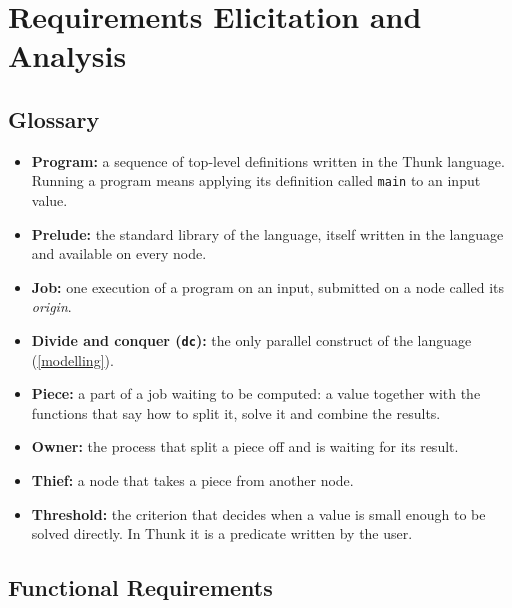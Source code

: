 \documentclass{scrartcl}
\begin{document}
\section{Requirements Elicitation and Analysis}\label{requirements}

\subsection{Glossary}

\begin{itemize}
  \item \textbf{Program:} a sequence of top-level definitions written in the Thunk language. Running a program means applying its definition called \texttt{main} to an input value.
  \item \textbf{Prelude:} the standard library of the language, itself written in the language and available on every node.
  \item \textbf{Job:} one execution of a program on an input, submitted on a node called its \emph{origin}.
  \item \textbf{Divide and conquer (\texttt{dc}):} the only parallel construct of the language (\cref{modelling}).
  \item \textbf{Piece:} a part of a job waiting to be computed: a value together with the functions that say how to split it, solve it and combine the results.
  \item \textbf{Owner:} the process that split a piece off and is waiting for its result.
  \item \textbf{Thief:} a node that takes a piece from another node.
  \item \textbf{Threshold:} the criterion that decides when a value is small enough to be solved directly. In Thunk it is a predicate written by the user.
\end{itemize}

\subsection{Functional Requirements}
\end{document}
